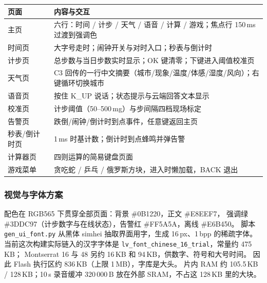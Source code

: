 \begin{center}
\small
\begin{tabular}{@{}p{2.2cm}p{11.4cm}@{}}
\toprule
页面 & 内容与交互\\
\midrule
主页 & 六行：时间 / 计步 / 天气 / 语音 / 计算 / 游戏；焦点行 150\,ms 过渡到强调色\\
时间页 & 大字号走时；闹钟开关与对时入口；秒表与倒计时\\
计步页 & 总步数与当日步数实时显示；OK 键清零；下键进入阈值校准页\\
天气页 & C3 回传的一行中文摘要（城市/现象/温度/体感/湿度/风向）；右键循环切换城市\\
语音页 & 按住 K\_UP 说话；状态提示与云端回答文本显示\\
校准页 & 计步阈值（50--500\,mg）与步间隔四档现场标定\\
告警页 & 跌倒/闹钟/倒计时到点事件，任意键返回主页\\
秒表/倒计时页 & 1\,ms 时基计数；倒计时到点蜂鸣并弹告警\\
计算器页 & 四则运算的简易键盘页面\\
游戏菜单 & 贪吃蛇 / 乒乓 / 俄罗斯方块，进入时懒加载，BACK 退出\\
\bottomrule
\end{tabular}
\end{center}

\subsubsection{视觉与字体方案}
配色在 RGB565 下贯穿全部页面：背景 \#0B1220，正文 \#E8EEF7，
强调绿 \#3DDC97（计步数字与在线状态），告警红 \#FF5A5A，离线 \#E6B450。
脚本 \texttt{gen\_ui\_font.py} 从黑体 simhei 抽取界面用字，生成 16\,px、1\,bpp 的稀疏字体。
当前这次构建实际链入的汉字字体是 \texttt{lv\_font\_chinese\_16\_trial}，常量约 475\,KB；
Montserrat 16 与 48 另约 16\,KB 和 94\,KB，供数字、符号和大号时间。
因此 Flash 执行区约 836\,KB（上限 1\,MB），字库是大头。
片内 RAM 约 105.5\,KB / 128\,KB；10\,s 录音缓冲 320\,000\,B 放在外部 SRAM，不占这 128\,KB 里的大块。
